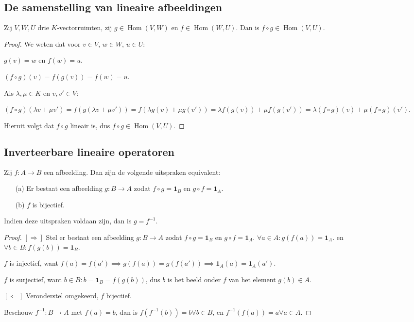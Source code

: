 \subsection{De samenstelling van lineaire afbeeldingen}

\begin{lemma}[3.5.2]
    Zij $V, W, U$ drie $K$-vectorruimten, zij $g \in \operatorname{Hom}(V, W)$ en $f \in \operatorname{Hom}(W, U)$. Dan is $f \circ g \in \operatorname{Hom}(V, U)$.
\end{lemma}
\begin{proof}
    We weten dat voor \(v \in V, \, w \in W ,\, u \in U\):

    \(g(v) = w \text{ en }f(w) = u\).

    \((f \circ g)(v) = f(g(v)) = f(w) = u\).

    Als \(\lambda,\mu \in K\) en \(v,v' \in V\):

    \(
        (f \circ g)(\lambda v + \mu v')
        = f(g(\lambda v + \mu v'))
        = f(\lambda g(v) + \mu g(v'))
        = \lambda f(g(v)) + \mu f(g(v'))
        = \lambda (f \circ g)(v) + \mu (f \circ g)(v')
    \).

    Hieruit volgt dat \(f \circ g\) lineair is, dus \(f \circ g \in \operatorname{Hom}(V, U)\).
\end{proof}
\subsection{Inverteerbare lineaire operatoren}

\begin{lemma}[3.6.2]
    Zij $f \colon A \to B$ een afbeelding. Dan zijn de volgende uitspraken equivalent:
    \begin{enumerate}
        \item[(a)] Er bestaat een afbeelding $g \colon B \to A$ zodat $f \circ g = \mathbf{1}_B$ en $g \circ f = \mathbf{1}_A$.
        \item[(b)] $f$ is bijectief.
    \end{enumerate}
    Indien deze uitspraken voldaan zijn, dan is $g = f^{-1}$.
\end{lemma}
\begin{proof}
      \([\Rightarrow]\)  Stel er bestaat een afbeelding $g \colon B \to A$ zodat $f \circ g = \mathbf{1}_B$ en $g \circ f = \mathbf{1}_A$.
        \(\forall a \in A: g(f(a)) = \mathbf{1}_A.\) en \(\forall b \in B: f(g(b)) = \mathbf{1}_B.\)

        \(f\) is injectief, want \(f(a)=f(a') \implies g(f(a))=g(f(a')) \implies \mathbf{1}_A(a) = \mathbf{1}_A(a').  \)

        \(f\) is surjectief, want \(b \in B: b = \mathbf{1}_B = f(g(b))\),
        dus \(b\) is het beeld onder \(f\) van het element \(g(b) \in A\).

    \([\Leftarrow]\) Veronderstel omgekeerd, \(f\) bijectief.

    Beschouw \(f^{-1}: B \to A\) met \(f(a) = b\), dan is \(f(f^{-1}(b))=b\forall b \in B\),
    en \(f^{-1}(f(a))=a\forall a \in A\).
\end{proof}
